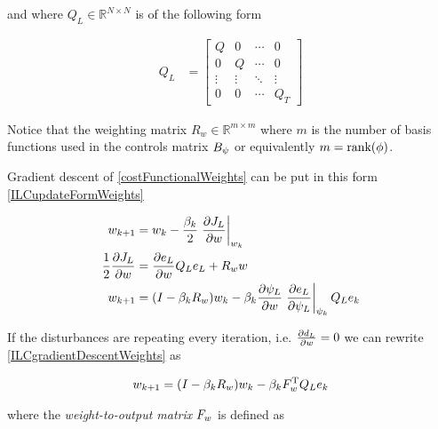 \noindent and where $Q_L \in \mathbb{R}^{N \times N}$ is of the following form

\begin{equation*}
\begin{aligned}
 Q_L &= 
 \begin{bmatrix}
  Q & 0 & \cdots & 0 \\
  0 & Q & \cdots & 0 \\
  \vdots  & \vdots  & \ddots & \vdots  \\
  0 & 0 & \cdots & Q_T
 \end{bmatrix}
\end{aligned}
\end{equation*}

Notice that the weighting matrix $R_w \in \mathbb{R}^{m \times m}$ where $m$ is the number of basis functions used in the controls matrix $B_{\psi}$ or equivalently $m = \text{rank}(\phi)$.

Gradient descent of \eqref{costFunctionalWeights} can be put in this form \eqref{ILCupdateFormWeights}

\begin{equation}
\begin{aligned}
w_{k+1} &= w_k - \frac{\beta_k}{2} \left.\frac{\partial{J_L}}{\partial{w}}\right|_{w_k} \\
\frac{1}{2}\frac{\partial{J_L}}{\partial{w}} &= \frac{\partial{e_L}}{\partial{w}}Q_Le_L + R_{w}w \\
w_{k+1} &= (I - \beta_kR_{w})w_k - \beta_k\frac{\partial{\psi_L}}{\partial{w}}\left.\frac{\partial{e_L}}{\partial{\psi_L}}\right|_{\psi_k}Q_Le_k
\end{aligned}
\label{ILCgradientDescentWeights}
\end{equation}

If the disturbances are repeating every iteration, i.e. $\frac{\partial{d_L}}{\partial{w}} = 0$ we can rewrite \eqref{ILCgradientDescentWeights} as

\begin{equation}
\begin{aligned}
w_{k+1} = (I - \beta_kR_{w})w_k - \beta_kF_{w}^\mathrm{T}Q_Le_k
\end{aligned}
\label{ILCgradientDescentWeights2}
\end{equation}

where the \emph{weight-to-output matrix} $F_{w}$ is defined as

